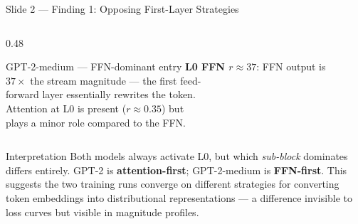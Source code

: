 \documentclass[aspectratio=169,10pt]{beamer}
\begin{document}
\begin{frame}{Slide 2 — Finding 1: Opposing First-Layer Strategies}
\begin{columns}[T]
\begin{column}{0.48\textwidth}
\begin{block}{\textcolor{mlpblue}{GPT-2-medium} — FFN-dominant entry}
\medskip
\textbf{L0 FFN $r \approx 37$}: FFN output is\\
$37\times$ the stream magnitude — the first feed-\\
forward layer essentially rewrites the token.\\[4pt]
Attention at L0 is present ($r\approx0.35$) but\\
plays a minor role compared to the FFN.
\end{block}
\end{column}

\end{columns}

\vspace{6pt}
\begin{alertblock}{Interpretation}
\footnotesize
Both models always activate L0, but which \emph{sub-block} dominates differs entirely.
GPT-2 is \textbf{attention-first}; GPT-2-medium is \textbf{FFN-first}.
This suggests the two training runs converge on different strategies for converting token embeddings into
distributional representations — a difference invisible to loss curves but visible in magnitude profiles.
\end{alertblock}

\end{frame}
\end{document}
